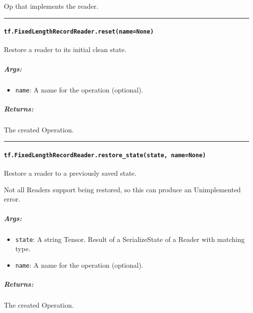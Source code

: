Op that implements the reader.

\begin{center}\rule{0.5\linewidth}{\linethickness}\end{center}

\paragraph{\texorpdfstring{\texttt{tf.FixedLengthRecordReader.reset(name=None)}
}{tf.FixedLengthRecordReader.reset(name=None) }}\label{tf.fixedlengthrecordreader.resetnamenone}

Restore a reader to its initial clean state.

\subparagraph{Args: }\label{args-40}

\begin{itemize}
\tightlist
\item
  \texttt{name}: A name for the operation (optional).
\end{itemize}

\subparagraph{Returns: }\label{returns-34}

The created Operation.

\begin{center}\rule{0.5\linewidth}{\linethickness}\end{center}

\paragraph{\texorpdfstring{\texttt{tf.FixedLengthRecordReader.restore\_state(state,\ name=None)}
}{tf.FixedLengthRecordReader.restore\_state(state, name=None) }}\label{tf.fixedlengthrecordreader.restoreux5fstatestate-namenone}

Restore a reader to a previously saved state.

Not all Readers support being restored, so this can produce an
Unimplemented error.

\subparagraph{Args: }\label{args-41}

\begin{itemize}
\tightlist
\item
  \texttt{state}: A string Tensor. Result of a SerializeState of a
  Reader with matching type.
\item
  \texttt{name}: A name for the operation (optional).
\end{itemize}

\subparagraph{Returns: }\label{returns-35}

The created Operation.

